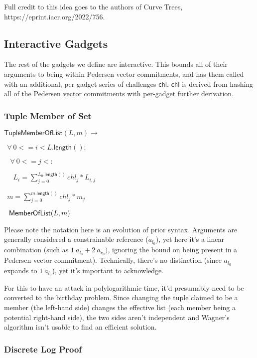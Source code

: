 \documentclass[]{article}
\begin{document}
Full credit to this idea goes to the authors of Curve Trees, https://eprint.iacr.org/2022/756.

\newpage

\subsection{Interactive Gadgets}

\newcommand{\chl}{\mathsf{chl}}

The rest of the gadgets we define are interactive. This bounds all of their arguments to being within Pedersen vector commitments, and has them called with an additional, per-gadget series of challenges $\chl$. $\chl$ is derived from hashing all of the Pedersen vector commitments with per-gadget further derivation.

\subsubsection{Tuple Member of Set}

\newcommand{\tuplememberlist}{\mathsf{TupleMemberOfList}}

$\tuplememberlist(L, m) \rightarrow$

$~~\forall ~0 <= i < L\mathsf{.length}():$

$~~~~\forall ~0 <= j < :$

$~~~~~~L_i = \sum^{L_0\mathsf{.length}()}_{j=0} chl_j * L_{i,j}$

$~~m = \sum^{m\mathsf{.length}()}_{j=0} chl_j * m_j$

$~~\mathsf{MemberOfList}(L, m)$

Please note the notation here is an evolution of prior syntax. Arguments are generally considered a constrainable reference ($a_{l_0}$), yet here it's a linear combination (such as $1 ~a_{l_0} + 2 ~a_{r_0})$, ignoring the bound on being present in a Pedersen vector commitment). Technically, there's no distinction (since $a_{l_0}$ expands to $1 ~a_{l_0}$), yet it's important to acknowledge.

For this to have an attack in polylogarithmic time, it'd presumably need to be converted to the birthday problem. Since changing the tuple claimed to be a member (the left-hand side) changes the effective list (each member being a potential right-hand side), the two sides aren't independent and Wagner's algorithm isn't usable to find an efficient solution.

\newpage

\subsubsection{Discrete Log Proof}
\end{document}
